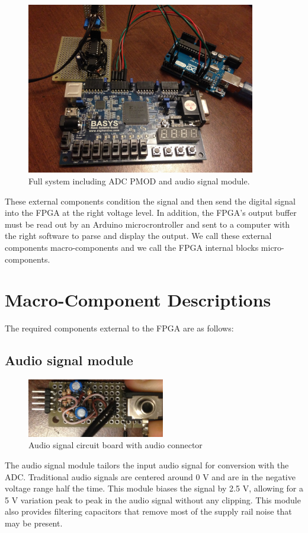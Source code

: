 \documentclass[12pt]{article}
\begin{document}
    \begin{figure}[H]
      \centering
      \includegraphics[width=100mm]{full_system.JPG}
      \caption{Full system including ADC PMOD and audio signal module.}
      \label{overflow}
    \end{figure}
    
    These external components condition the signal and then send the digital signal into the FPGA at the right voltage level. In addition, the FPGA's output buffer must be read out by an Arduino microcrontroller and sent to a computer with the right software to parse and display the output. We call these external components macro-components and we call the FPGA internal blocks micro-components.
  
  \section*{Macro-Component Descriptions}
    The required components external to the FPGA are as follows:
    \subsection*{Audio signal module}
      \begin{figure}[H]
        \centering
        \includegraphics[width=60mm]{audio_sig_mod.JPG}
        \caption{Audio signal circuit board with audio connector}
        \label{overflow}
      \end{figure}
      The audio signal module tailors the input audio signal for conversion with the ADC. Traditional audio signals are centered around 0 V and are in the negative voltage range half the time. This module biases the signal by 2.5 V, allowing for a 5 V variation peak to peak in the audio signal without any clipping. This module also provides filtering capacitors that remove most of the supply rail noise that may be present.
\end{document}
